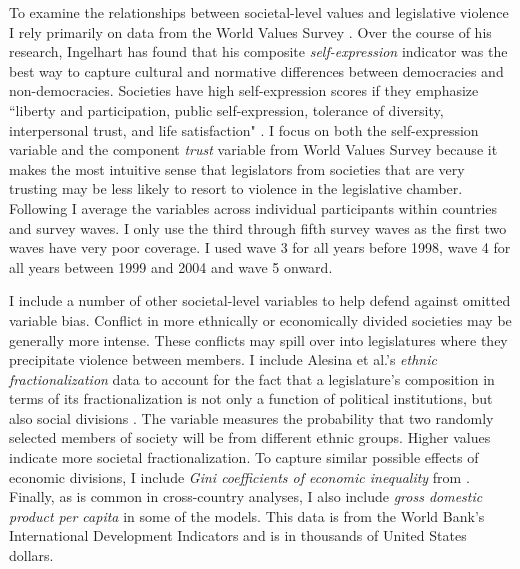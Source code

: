 \documentclass[a4paper]{article}\usepackage{graphicx, color}
\begin{document}
To examine the relationships between societal-level values and legislative violence I rely primarily on data from the World Values Survey \citep{WVS2009}. Over the course of his research, Ingelhart has found that his composite {\emph{self-expression}} indicator was the best way to capture cultural and normative differences between democracies and non-democracies. Societies have high self-expression scores if they emphasize ``liberty and participation, public self-expression, tolerance of diversity, interpersonal trust, and life satisfaction" \citep[64]{Inglehart2003}. I focus on both the self-expression variable and the component {\emph{trust}} variable from World Values Survey because it makes the most intuitive sense that legislators from societies that are very trusting may be less likely to resort to violence in the legislative chamber. Following \cite{Inglehart2003} I average the variables across individual participants within countries and survey waves. I only use the third through fifth survey waves as the first two waves have very poor coverage. I used wave 3 for all years before 1998, wave 4 for all years between 1999 and 2004 and wave 5 onward. 

I include a number of other societal-level variables to help defend against omitted variable bias. Conflict in more ethnically or economically divided societies may be generally more intense. These conflicts may spill over into legislatures where they precipitate violence between members. I include Alesina et al.'s \citeyearpar{Alesina2003} {\emph{ethnic fractionalization}} data to account for the fact that a legislature's composition in terms of its fractionalization is not only a function of political institutions, but also social divisions \citep{Neto1997, Mozaffar2003}. The variable measures the probability that two randomly selected members of society will be from different ethnic groups. Higher values indicate more societal fractionalization. To capture similar possible effects of economic divisions, I include {\emph{Gini coefficients of economic inequality}} from \cite{UNU2008}. Finally, as is common in cross-country analyses, I also include {\emph{gross domestic product per capita}} in some of the models. This data is from the World Bank's International Development Indicators \citeyearpar{WorldBank2011} and is in thousands of United States dollars.
\end{document}
